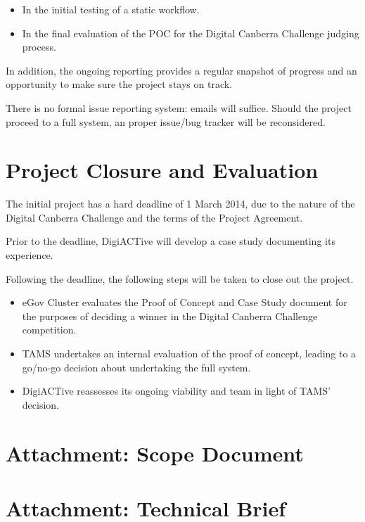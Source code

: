 \documentclass[12pt,a4paper,twosided]{article}
\begin{document}
\begin{itemize}
\itemsep1pt\parskip0pt
\item
  In the initial testing of a static workflow.
\item
  In the final evaluation of the POC for the Digital Canberra Challenge
  judging process.
\end{itemize}

In addition, the ongoing reporting provides a regular snapshot of
progress and an opportunity to make sure the project stays on track.

There is no formal issue reporting system: emails will suffice. Should
the project proceed to a full system, an proper issue/bug tracker will
be reconsidered.

\section{Project Closure and Evaluation}

The initial project has a hard deadline of 1 March 2014, due to the
nature of the Digital Canberra Challenge and the terms of the Project
Agreement.

Prior to the deadline, DigiACTive will develop a case study documenting
its experience.

Following the deadline, the following steps will be taken to close out
the project.

\begin{itemize}
\itemsep1pt\parskip0pt
\item
  eGov Cluster evaluates the Proof of Concept and Case Study document
  for the purposes of deciding a winner in the Digital Canberra
  Challenge competition.
\item
  TAMS undertakes an internal evaluation of the proof of concept,
  leading to a go/no-go decision about undertaking the full system.
\item
  DigiACTive reassesses its ongoing viability and team in light of TAMS'
  decision.
\end{itemize}

\section{Attachment: Scope Document}



\section{Attachment: Technical Brief}
\end{document}

